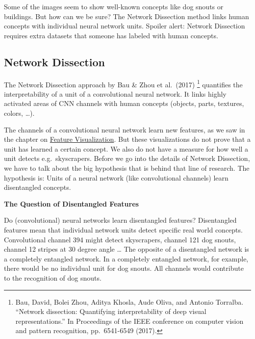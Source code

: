 \documentclass[
  10pt,
]{scrbook}
\begin{document}
Some of the images seem to show well-known concepts like dog snouts or buildings.
But how can we be sure?
The Network Dissection method links human concepts with individual neural network units.
Spoiler alert: Network Dissection requires extra datasets that someone has labeled with human concepts.

\hypertarget{network-dissection}{%
\subsection{Network Dissection}\label{network-dissection}}

The Network Dissection approach by Bau \& Zhou et al.~(2017) \footnote{Bau, David, Bolei Zhou, Aditya Khosla, Aude Oliva, and Antonio Torralba. ``Network dissection: Quantifying interpretability of deep visual representations.'' In Proceedings of the IEEE conference on computer vision and pattern recognition, pp.~6541-6549 (2017).} quantifies the interpretability of a unit of a convolutional neural network.
It links highly activated areas of CNN channels with human concepts (objects, parts, textures, colors, \ldots).

The channels of a convolutional neural network learn new features, as we saw in the chapter on \protect\hyperlink{feature-visualization}{Feature Visualization}.
But these visualizations do not prove that a unit has learned a certain concept.
We also do not have a measure for how well a unit detects e.g.~skyscrapers.
Before we go into the details of Network Dissection, we have to talk about the big hypothesis that is behind that line of research.
The hypothesis is:
Units of a neural network (like convolutional channels) learn disentangled concepts.

\textbf{The Question of Disentangled Features}

Do (convolutional) neural networks learn disentangled features?
Disentangled features mean that individual network units detect specific real world concepts.
Convolutional channel 394 might detect skyscrapers, channel 121 dog snouts, channel 12 stripes at 30 degree angle \ldots{}
The opposite of a disentangled network is a completely entangled network.
In a completely entangled network, for example, there would be no individual unit for dog snouts.
All channels would contribute to the recognition of dog snouts.
\end{document}
